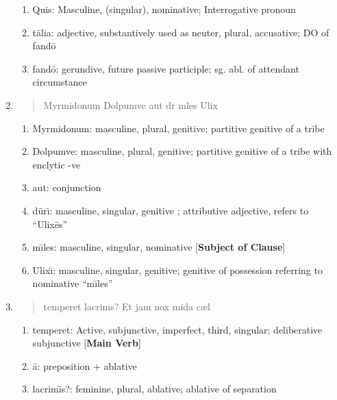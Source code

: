 \documentclass[]{article}
\newcommand{\latify}[1]{
        \Large
        \begin{verse}
          \begin{metrica}
          {#1}\\
          \end{metrica}
        \end{verse}
        \normalsize
}
\begin{document}
\begin{enumerate}
\begin{enumerate}
	\item Quis:   Masculine, (singular), nominative; Interrogative pronoun

	\item t\={a}lia:  adjective, substantively used as neuter, plural, accusative; DO of fand\={o}

	\item fand\={o}: gerundive, future passive participle; sg. abl. of attendant circumstance
\end{enumerate}

\item \latify{Myrmidonum Dolpumve aut d{}r{\macron {\i}} m{\macron {\i}}les Ulix{\macron {\i}}}
\begin{enumerate}

	\item Myrmidonum:  masculine, plural, genitive; partitive genitive of a tribe

	\item Dolpumve:  masculine, plural, genitive; partitive genitive of a tribe with enclytic -ve

	\item aut:  conjunction

	\item d\={u}r\={\i}:  masculine, singular, genitive ; attributive adjective, refers to ``Ulix\={e}s''

	\item m\={\i}les: masculine, singular, nominative [\textbf{Subject of Clause}]

	\item Ulix\={\i}: masculine, singular, genitive; genitive of possession referring to nominative ``m\={\i}les''

\end{enumerate}


\item \latify{temperet {} lacrim{\macron {\i}}s?  Et jam nox {\macron {u}}mida c{\ae}l{\macron {o}}}
\begin{enumerate}

	\item temperet:   Active, subjunctive, imperfect, third, singular; deliberative subjunctive [\textbf{Main Verb}]

	\item \={a}:  preposition + ablative

	\item lacrim\={\i}s?:  feminine, plural, ablative; ablative of separation


\end{enumerate}
\end{enumerate}
\end{document}
